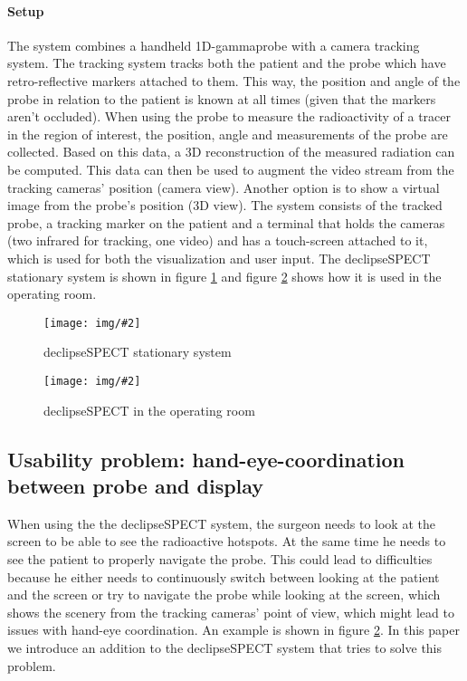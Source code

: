 \documentclass{scrartcl}
\newcommand{\graphic}[3][width=\linewidth] %
{
  \begin{figure}[h!t]
    \centering
    \texttt{[image: img/\#2]}
    \caption{#3}
    \label{fig:#2}
  \end{figure}
}
\newcommand{\refFigure}[1]{figure \ref{fig:#1}}
\begin{document}
\paragraph*{Setup}
The system combines a handheld 1D-gammaprobe with a camera tracking system. The tracking system tracks both the patient and the probe which have retro-reflective markers attached to them. This way, the position and angle of the probe in relation to the patient is known at all times (given that the markers aren't occluded). When using the probe to measure the radioactivity of a tracer in the region of interest, the position, angle and measurements of the probe are collected. Based on this data, a 3D reconstruction of the measured radiation can be computed.
This data can then be used to augment the video stream from the tracking cameras' position (camera view). Another option is to show a virtual image from the probe's position (3D view).
The system consists of the tracked probe, a tracking marker on the patient and a terminal that holds the cameras (two infrared for tracking, one video) and has a touch-screen attached to it, which is used for both the visualization and user input. The declipseSPECT stationary system is shown in \refFigure{declipseSPECT} and \refFigure{declipseSPECT-OR} shows how it is used in the operating room.
\graphic[scale=.7]{declipseSPECT}{declipseSPECT stationary system \cite{surgiceye}}
\graphic[scale=.7]{declipseSPECT-OR}{declipseSPECT in the operating room \cite{surgiceye}}


\subsection{Usability problem: hand-eye-coordination between probe and display}
When using the the declipseSPECT system, the surgeon needs to look at the screen to be able to see the radioactive hotspots. At the same time he needs to see the patient to properly navigate the probe. This could lead to difficulties because he either needs to continuously switch between looking at the patient and the screen or try to navigate the probe while looking at the screen, which shows the scenery from the tracking cameras' point of view, which might lead to issues with hand-eye coordination. An example is shown in \refFigure{declipseSPECT-OR}.
In this paper we introduce an addition to the declipseSPECT system that tries to solve this problem.
\end{document}
